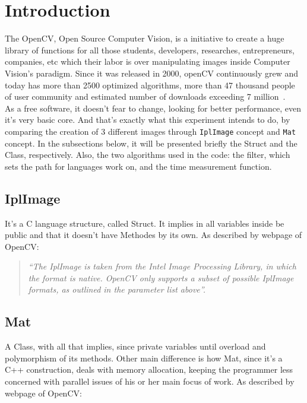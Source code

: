 \section{Introduction}\label{sec:2}
    The OpenCV, Open Source Computer Vision, is a initiative to create a huge library of functions for all those students, developers, researches, entrepreneurs, companies, etc which their labor is over manipulating images inside Computer Vision's paradigm. Since it was released in 2000, openCV continuously grew and today has more than 2500 optimized algorithms, more than 47 thousand people of user community and estimated number of downloads exceeding 7 million~\cite{OpenCV}.\\
    
    As a free software, it doesn't fear to change, looking for better performance, even it's very basic core. And that's exactly what this experiment intends to do, by comparing the creation of 3 different images through \texttt{IplImage} concept and \texttt{Mat} concept. In the subsections below, it will be presented briefly the Struct and the Class, respectively. Also, the two algorithms used in the code: the filter, which sets the path for languages work on, and the time measurement function.   

    \subsection{IplImage}
        It's a C language structure, called Struct. It implies in all variables inside be public and that it doesn't have Methodes by its own. As described by webpage of OpenCV:
        \begin{quotation}
        
        \emph{
        ``The IplImage is taken from the Intel Image Processing Library, in which the format is native. OpenCV only supports a subset of possible IplImage formats, as outlined in the parameter list above''.}
        \end{quotation} 

    \subsection{Mat}
        A Class, with all that implies, since private variables until overload and polymorphism of its methods. Other main difference is how Mat, since it's a C++ construction, deals with memory allocation, keeping the programmer less concerned with parallel issues of his or her main focus of work. As described by webpage of OpenCV: 

